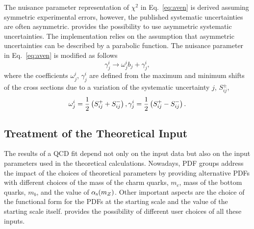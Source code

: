 %
The nuisance parameter representation of $\chi^2$ in Eq.~\ref{eq:aven} is derived assuming 
symmetric experimental errors, however, the published systematic uncertainties are 
often asymmetric.
\fitter provides the possibility to use asymmetric systematic uncertainties.
The implementation relies on the assumption that 
asymmetric uncertainties can be described by a parabolic function.
The nuisance parameter in Eq.~\ref{eq:aven} is modified as follows
\begin{equation}
  \gamma^i_{j} \to \omega^i_{j}b_j + \gamma^i_{j},
\end{equation}
where the coefficients $\omega^i_{j}$, $\gamma^i_{j}$ are defined  
from the maximum and minimum shifts of the cross sections due to a  variation of the systematic uncertainty $j$, 
$S_{ij}^{\pm}$,
\begin{equation}
  \omega^i_{j}=\frac{1}{2}\left(S_{ij}^{+}+S_{ij}^{-}\right), \\
  \gamma^i_{j}=\frac{1}{2}\left(S_{ij}^{+}-S_{ij}^{-}\right). 
\end{equation}



\subsection{Treatment of the Theoretical Input}
\label{sec:theoryerr}

The results of a QCD fit depend not only on the input data but also on the 
input parameters used in the theoretical calculations. Nowadays, PDF groups 
address the impact of the choices of theoretical parameters
by providing
alternative PDFs with different choices of the mass of the charm quarks, $m_c$, 
mass of the bottom quarks, $m_b$, and the value of $\alpha_\mathrm{s}(m_Z)$. 
Other important aspects are the choice of the functional form for the PDFs at the 
starting scale and the value of the starting scale itself. 
\fitter provides the
possibility of different user choices of all these inputs.%


